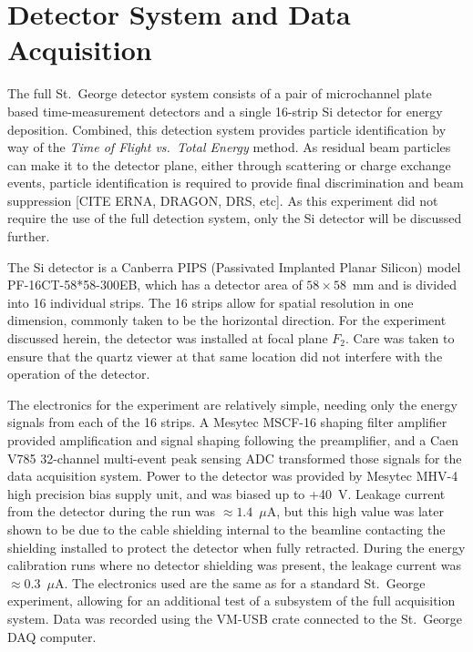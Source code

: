 \section{Detector System and Data Acquisition}
\label{sec:detector}

The full St.\ George detector system consists of a pair of microchannel
plate based time-measurement detectors and a single 16-strip Si detector for
energy deposition. Combined, this detection system provides particle
identification by way of the \textit{Time of Flight vs.\ Total Energy}
method. As residual beam particles can make it to the detector plane, either
through scattering or charge exchange events, particle identification is
required to provide final discrimination and beam suppression
[CITE ERNA, DRAGON, DRS, etc]. As this experiment did not require the use of
the full detection system, only the Si detector will be discussed further.

The Si detector is a Canberra PIPS (Passivated Implanted Planar Silicon)
model PF-16CT-58*58-300EB, which has a detector area of $58\times 58$~mm
and is divided into 16 individual strips. The 16 strips allow for spatial
resolution in one dimension, commonly taken to be the horizontal direction.
For the experiment discussed herein, the detector was installed at focal plane
$F_2$. Care was taken to ensure that the quartz viewer at that same location
did not interfere with the operation of the detector.

The electronics for the experiment are relatively simple, needing only the
energy signals from each of the 16 strips. A Mesytec MSCF-16 shaping filter
amplifier provided amplification and signal shaping following the preamplifier,
and a Caen V785 32-channel multi-event peak sensing ADC transformed those
signals for the data acquisition system. Power to the detector was provided by
Mesytec MHV-4 high precision bias supply unit, and was biased up to +40~V.
Leakage current from the detector during the run was $\approx 1.4$~$\mu$A, but
this high value was later shown to be due to the cable shielding internal to
the beamline contacting the shielding installed to protect the detector when
fully retracted. During the energy calibration runs where no detector shielding
was present, the leakage current was $\approx 0.3$~$\mu$A. The electronics used
are the same as for a standard St.\ George experiment, allowing for an
additional test of a subsystem of the full acquisition system. Data was
recorded using the VM-USB crate connected to the St.\ George DAQ
computer.


